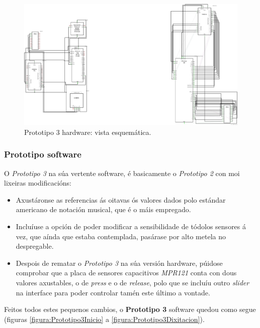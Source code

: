   \begin{figure}[htbp]
   \centering
   \includegraphics[scale=30.0,keepaspectratio=true]{./imagenes/prototipo3_esquema.png}
   \caption{Prototipo 3 hardware: vista esquemática.}
   \label{figura:Prototipo3HardwareEsquema}
  \end{figure}

  \subsubsection{Prototipo software}

  O \textit{Prototipo 3} na súa vertente software, é basicamente o
  \textit{Prototipo 2} con moi lixeiras modificacións:

  \begin{itemize}
   \item Axustáronse as referencias ás oitavas ós valores dados polo estándar
         americano de notación musical, que é o máis empregado.
   \item Incluíuse a opción de poder modificar a sensibilidade de tódolos
         sensores á vez, que aínda que estaba contemplada, pasárase por alto
         metela no despregable.
   \item Despois de rematar o \textit{Prototipo 3} na súa versión hardware,
         púidose comprobar que a placa de sensores capacitivos \textit{MPR121}
         conta con dous valores axustables, o de \textit{press} e o de
         \textit{release}, polo que se incluíu outro \textit{slider} na
         interface para poder controlar tamén este último a vontade.
  \end{itemize}

  Feitos todos estes pequenos cambios, o \textbf{Prototipo 3} software quedou
  como segue (figuras \ref{figura:Prototipo3Inicio} a 
  \ref{figura:Prototipo3Dixitacion}).

